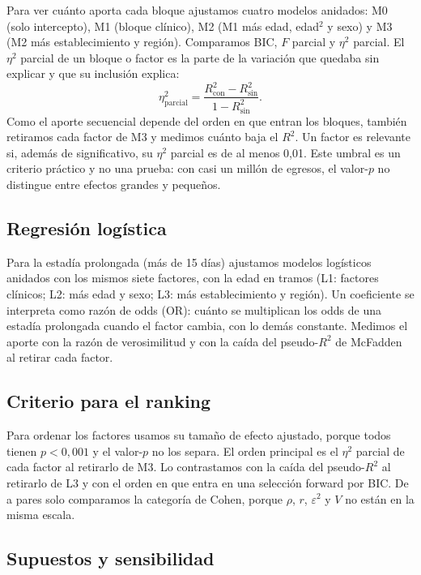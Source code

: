 \documentclass[10.5pt,a4paper,headings=small,abstract=false,bibliography=totoc,listof=totoc]{scrartcl}
\begin{document}
Para ver cuánto aporta cada bloque ajustamos cuatro modelos anidados: M0 (solo intercepto), M1 (bloque clínico), M2 (M1 más edad, edad$^2$ y sexo) y M3 (M2 más establecimiento y región). Comparamos BIC, $F$ parcial y $\eta^2$ parcial. El $\eta^2$ parcial de un bloque o factor es la parte de la variación que quedaba sin explicar y que su inclusión explica:
\[
\eta^2_{\text{parcial}}=\frac{R^2_{\text{con}}-R^2_{\text{sin}}}{1-R^2_{\text{sin}}}.
\]
Como el aporte secuencial depende del orden en que entran los bloques, también retiramos cada factor de M3 y medimos cuánto baja el $R^2$. Un factor es relevante si, además de significativo, su $\eta^2$ parcial es de al menos 0,01. Este umbral es un criterio práctico y no una prueba: con casi un millón de egresos, el valor-$p$ no distingue entre efectos grandes y pequeños.

\subsection{Regresión logística}

Para la estadía prolongada (más de 15 días) ajustamos modelos logísticos anidados con los mismos siete factores, con la edad en tramos (L1: factores clínicos; L2: más edad y sexo; L3: más establecimiento y región). Un coeficiente se interpreta como razón de odds (OR): cuánto se multiplican los odds de una estadía prolongada cuando el factor cambia, con lo demás constante. Medimos el aporte con la razón de verosimilitud y con la caída del pseudo-$R^2$ de McFadden al retirar cada factor.

\subsection{Criterio para el ranking}

Para ordenar los factores usamos su tamaño de efecto ajustado, porque todos tienen $p<0{,}001$ y el valor-$p$ no los separa. El orden principal es el $\eta^2$ parcial de cada factor al retirarlo de M3. Lo contrastamos con la caída del pseudo-$R^2$ al retirarlo de L3 y con el orden en que entra en una selección forward por BIC. De a pares solo comparamos la categoría de Cohen, porque $\rho$, $r$, $\varepsilon^2$ y $V$ no están en la misma escala.

\subsection{Supuestos y sensibilidad}
\end{document}
